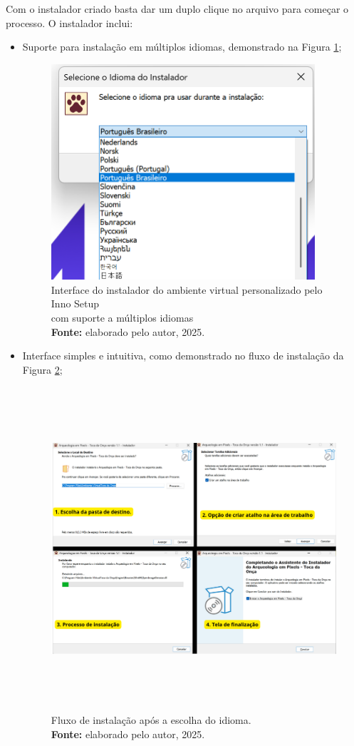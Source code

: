 Com o instalador criado basta dar um duplo clique no arquivo para começar o processo. O instalador inclui:
\begin{itemize}
    \item Suporte para instalação em múltiplos idiomas, demonstrado na Figura \ref{fig:idiomas};
    \begin{figure}[H]
        \centering
        \includegraphics[height=8cm, keepaspectratio]{img/Inno setup/multiidiomas.png}
        \caption{Interface do instalador do ambiente virtual personalizado pelo Inno Setup \\ com suporte a múltiplos idiomas \\
            \textbf{Fonte:} elaborado pelo autor, 2025.}
        \label{fig:idiomas}
\end{figure}

    \item Interface simples e intuitiva, como demonstrado no fluxo de instalação da Figura \ref{fig:fluxo};
    \begin{figure}[H]
        \centering
        \includegraphics[height=12cm, keepaspectratio]{img/Inno setup/fluxo de instalação.png}
        \caption{Fluxo de instalação após a escolha do idioma. \\
            \textbf{Fonte:} elaborado pelo autor, 2025.}
        \label{fig:fluxo}
\end{figure}


\end{itemize}
